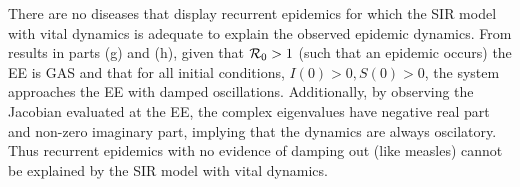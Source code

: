 There are no diseases that display recurrent epidemics for which the SIR model with vital dynamics is adequate to explain the observed epidemic dynamics. From results in parts (g) and (h), given that ${\cal R}_0 > 1$ (such that an epidemic occurs) the EE is GAS and that for all initial conditions, $I(0) > 0, S(0) > 0$, the system approaches the EE with damped oscillations. Additionally, by observing the Jacobian evaluated at the EE, the complex eigenvalues have negative real part and non-zero imaginary part, implying that the dynamics are always oscilatory. Thus recurrent epidemics with no evidence of damping out (like measles) cannot be explained by the SIR model with vital dynamics. 
